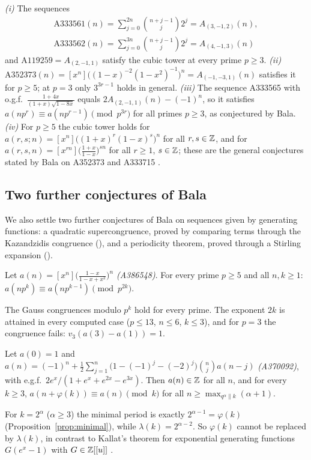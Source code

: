 \documentclass[11pt]{amsart}
\begin{document}
\begin{corollary}\label{cor:oeis}
\emph{(i)} The sequences
\begin{gather*} \text{A333561}(n)=\sum_{j=0}^{2n}\binom{n+j-1}{j}2^j=A_{(3,-1,2)}(n),\\ \text{A333562}(n)=\sum_{j=0}^{3n}\binom{n+j-1}j2^j=A_{(4,-1,3)}(n) \end{gather*}
and $\text{A119259}=A_{(2,-1,1)}$ satisfy the cubic tower at every prime $p\ge3$.
\emph{(ii)} $\text{A352373}(n)=[x^n]\bigl((1-x)^{-2}(1-x^2)^{-1}\bigr)^n=A_{(-1,-3,1)}(n)$ satisfies it for $p\ge5$; at $p=3$ only $3^{3r-1}$ holds in general.
\emph{(iii)} The sequence A333565 with o.g.f.\ $\frac{1+4x}{(1+x)\sqrt{1-8x}}$ equals $2A_{(2,-1,1)}(n)-(-1)^n$, so it satisfies $a(np^r)\equiv a(np^{r-1})\pmod{p^{3r}}$ for all primes $p\ge3$, as conjectured by Bala.
\emph{(iv)} For $p\ge5$ the cubic tower holds for $a(r,s;n)=[x^n]\bigl((1+x)^r(1-x)^s\bigr)^n$ for all $r,s\in\mathbb{Z}$, and for $a(r,s,n)=[x^{rn}]\bigl(\frac{1+x}{1-x}\bigr)^{sn}$ for all $r\ge1$, $s\in\mathbb{Z}$; these are the general conjectures stated by Bala on A352373 and A333715 \cite{bala}.
\end{corollary}

\subsection*{Two further conjectures of Bala}
We also settle two further conjectures of Bala on sequences given by generating functions: a quadratic supercongruence, proved by comparing terms through the Kazandzidis congruence (), and a periodicity theorem, proved through a Stirling expansion ().

\begin{theorem}\label{thm:386548}
Let $a(n)=[x^n]\bigl(\frac{1-x}{1-x+x^2}\bigr)^n$ \emph{(A386548)}. For every prime $p\ge5$ and all $n,k\ge1$: $a(np^k)\equiv a(np^{k-1})\pmod{p^{2k}}$.
\end{theorem}
The Gauss congruences modulo $p^k$ hold for every prime. The exponent $2k$ is attained in every computed case ($p\le13$, $n\le6$, $k\le3$), and for $p=3$ the congruence fails: $v_3(a(3)-a(1))=1$.

\begin{theorem}\label{thm:370092}
Let $a(0)=1$ and $a(n)=(-1)^n+\frac12\sum_{j=1}^n\bigl(1-(-1)^j-(-2)^j\bigr)\binom nja(n-j)$ \emph{(A370092)}, with e.g.f.\ $2e^x/(1+e^x+e^{2x}-e^{3x})$. Then $a(n)\in\mathbb{Z}$ for all $n$, and for every $k\ge3$, $a(n+\varphi(k))\equiv a(n)\pmod k$ for all $n\ge\max_{q^\alpha\parallel k}(\alpha+1)$.
\end{theorem}
For $k=2^\alpha$ ($\alpha\ge3$) the minimal period is exactly $2^{\alpha-1}=\varphi(k)$ (Proposition~\ref{prop:minimal}), while $\lambda(k)=2^{\alpha-2}$. So $\varphi(k)$ cannot be replaced by $\lambda(k)$, in contrast to Kallat's theorem for exponential generating functions $G(e^x-1)$ with $G\in\mathbb{Z}[[u]]$ \cite{kallat2026}.
\end{document}
